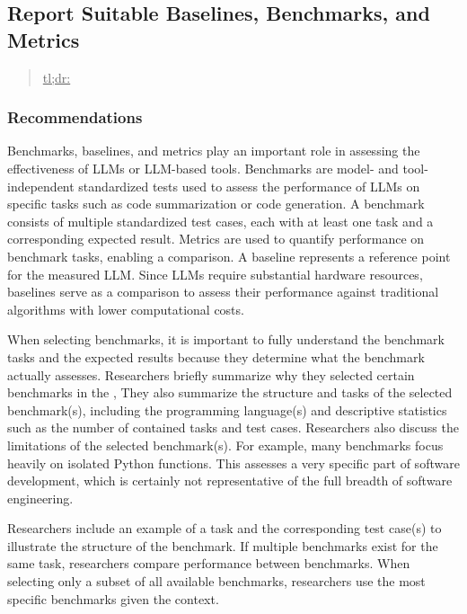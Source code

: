 



\subsection{Report Suitable Baselines, Benchmarks, and Metrics}
\label{sec:report-suitable-baselines-benchmarks-and-metrics}

\begin{quote}
\underline{tl;dr:} 
\end{quote}

\subsubsection{Recommendations}

Benchmarks, baselines, and metrics play an important role in assessing the effectiveness of LLMs or LLM-based tools.
Benchmarks are model- and tool-independent standardized tests used to assess the performance of LLMs on specific tasks such as code summarization or code generation.
A benchmark consists of multiple standardized test cases, each with at least one task and a corresponding expected result.
Metrics are used to quantify performance on benchmark tasks, enabling a comparison.
A baseline represents a reference point for the measured LLM.
Since LLMs require substantial hardware resources, baselines serve as a comparison to assess their performance against traditional algorithms with lower computational costs.

When selecting benchmarks, it is important to fully understand the benchmark tasks and the expected results because they determine what the benchmark actually assesses.
Researchers \must briefly summarize why they selected certain benchmarks in the \paper, 
They \should also summarize the structure and tasks of the selected benchmark(s), including the programming language(s) and descriptive statistics such as the number of contained tasks and test cases.
Researchers \should also discuss the limitations of the selected benchmark(s).
For example, many benchmarks focus heavily on isolated Python functions.
This assesses a very specific part of software development, which is certainly not representative of the full breadth of software engineering.

Researchers \may include an example of a task and the corresponding test case(s) to illustrate the structure of the benchmark.
If multiple benchmarks exist for the same task, researchers \should compare performance between benchmarks.
When selecting only a subset of all available benchmarks, researchers \should use the most specific benchmarks given the context.

